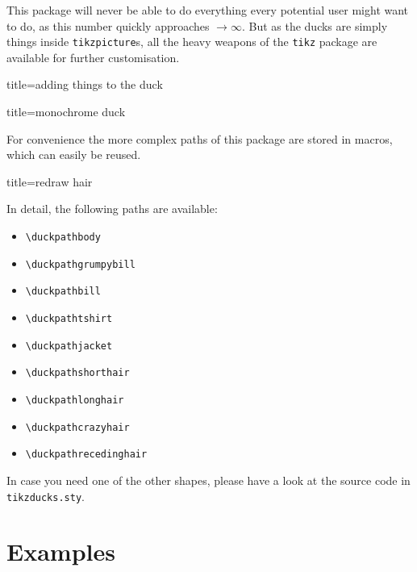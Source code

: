 \documentclass{scrartcl}
\begin{document}
This package will never be able to do everything every potential user might want to do, as this number quickly approaches $\rightarrow \infty$. But as the ducks are simply things inside \texttt{tikzpicture}s, all the heavy weapons of the \texttt{tikz} package are available for further customisation.

\begin{tcblisting}{title={adding things to the duck}}
\end{tcblisting}


\begin{tcblisting}{title={monochrome duck}}
\end{tcblisting}

For convenience the more complex paths of this package are stored in macros, which can easily be reused. 

\begin{tcblisting}{title={redraw hair}}
\begin{tikzpicture}
\duck
\path[preaction={fill, blue!50!black},pattern=fivepointed stars, pattern color=white]  
\duckpathlonghair;
\end{tikzpicture}
\end{tcblisting}

In detail, the following paths are available:
\begin{itemize}
\item \verb|\duckpathbody|
\item \verb|\duckpathgrumpybill|
\item \verb|\duckpathbill|
\item \verb|\duckpathtshirt|
\item \verb|\duckpathjacket|
\item \verb|\duckpathshorthair|
\item \verb|\duckpathlonghair|
\item \verb|\duckpathcrazyhair|
\item \verb|\duckpathrecedinghair|
\end{itemize}

In case you need one of the other shapes, please have a look at the source code in \verb|tikzducks.sty|.

\section{Examples}
\end{document}
